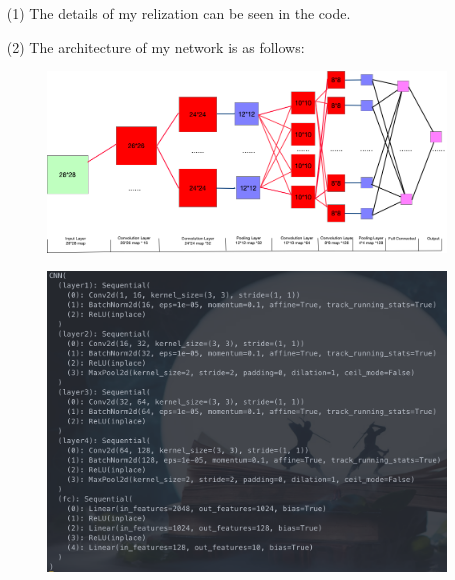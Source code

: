 \begin{solution}
    \begin{enumerate}
        \item[(1)] The details of my relization can be seen in the code.
        \item[(2)] The architecture of my network is as follows:
            \begin{figure}[H]
                \centering
                \includegraphics[scale=0.5]{1.png}
            \end{figure}
            \begin{figure}[H]
                \centering
                \includegraphics[scale=0.5]{5.png}

\end{figure}
\end{enumerate}
\end{solution}
